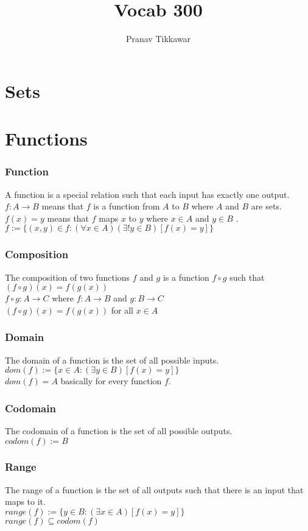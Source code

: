 \documentclass{article}
\author{Pranav Tikkawar}
\title{Vocab 300}
\begin{document}
\maketitle

\section{Sets}

\section{Functions}
\subsubsection*{Function}
A function is a special relation such that each input has exactly one output.\\
$f : A \rightarrow B$ means that $f$ is a function from $A$ to $B$ where $A$ and $B$ are sets.\\
$f(x) = y$ means that $f$ maps $x$ to $y$ where $x\in A$ and $y \in B$ .\\
$f := \{(x,y) \in f : (\forall x \in A)(\exists! y \in B)[f(x) = y]\}$
\subsubsection*{Composition}
The composition of two functions $f$ and $g$ is a function $f \circ g$ such that $(f \circ g)(x) = f(g(x))$\\
$f \circ g : A \rightarrow C$ where $f : A \rightarrow B$ and $g : B \rightarrow C$\\
$(f \circ g)(x) = f(g(x))$ for all $x \in A$
\subsubsection*{Domain}
The domain of a function is the set of all possible inputs.\\
$dom(f) := \{x \in A : (\exists y \in B)[f(x) = y]\}$ \\ 
$dom(f) = A$ basically for every function $f$.
\subsubsection*{Codomain}
The codomain of a function is the set of all possible outputs.\\
$codom(f) := B$
\subsubsection*{Range}
The range of a function is the set of all outputs such that there is an input that maps to it.\\
$range(f) := \{y \in B : (\exists x \in A)[f(x) = y]\}$\\
$range(f) \subseteq codom(f)$
\end{document}
